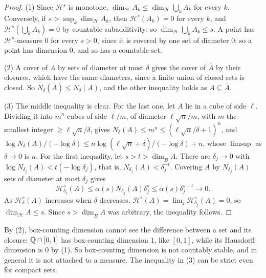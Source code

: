 \begin{proof}
(1) Since $\mathcal{H}^s$ is monotone, $\dim_{\mathcal{H}}A_k \leq \dim_{\mathcal{H}}\bigcup_kA_k$ for every $k$. Conversely, if $s > \sup_k\dim_{\mathcal{H}}A_k$, then $\mathcal{H}^s(A_k) = 0$ for every $k$, and
$\mathcal{H}^s(\bigcup_kA_k) = 0$ by countable subadditivity; so $\dim_{\mathcal{H}}\bigcup_kA_k \leq s$. A point has $\mathcal{H}^s$-measure $0$ for every $s > 0$, since it is covered by one set of
diameter $0$; so a point has dimension $0$, and so has a countable set.

(2) A cover of $A$ by sets of diameter at most $\delta$ gives the cover of $\overline A$ by their closures, which have the same diameters, since a finite union of closed sets is closed. So
$N_\delta(\overline A) \leq N_\delta(A)$, and the other inequality holds as $A \subseteq \overline A$.

(3) The middle inequality is clear. For the last one, let $A$ lie in a cube of side $\ell$. Dividing it into $m^n$ cubes of side $\ell/m$, of diameter $\ell\sqrt n/m$, with $m$ the smallest integer
$\geq \ell\sqrt n/\delta$, gives $N_\delta(A) \leq m^n \leq (\ell\sqrt n/\delta + 1)^n$, and $\log N_\delta(A)/(-\log\delta) \leq n\log(\ell\sqrt n + \delta)/(-\log\delta) + n$, whose $\limsup$ as
$\delta \to 0$ is $n$. For the first inequality, let $s > t > \underline{\dim}_BA$. There are $\delta_j \to 0$ with $\log N_{\delta_j}(A) < t(-\log\delta_j)$, that is, $N_{\delta_j}(A) < \delta_j^{-t}$.
Covering $A$ by $N_{\delta_j}(A)$ sets of diameter at most $\delta_j$ gives
\[
\mathcal{H}^s_{\delta_j}(A) \leq \alpha(s)N_{\delta_j}(A)\delta_j^s \leq \alpha(s)\delta_j^{s - t} \to 0 .
\]
As $\mathcal{H}^s_\delta(A)$ increases when $\delta$ decreases, $\mathcal{H}^s(A) = \lim_j\mathcal{H}^s_{\delta_j}(A) = 0$, so $\dim_{\mathcal{H}}A \leq s$. Since $s > \underline{\dim}_BA$ was arbitrary, the
inequality follows.
\end{proof}

By (2), box-counting dimension cannot see the difference between a set and its closure: $\mathbb{Q} \cap [0, 1]$ has box-counting dimension $1$, like $[0, 1]$, while its Hausdorff dimension is $0$ by (1).
So box-counting dimension is not countably stable, and in general it is not attached to a measure. The inequality in (3) can be strict even for compact sets.

